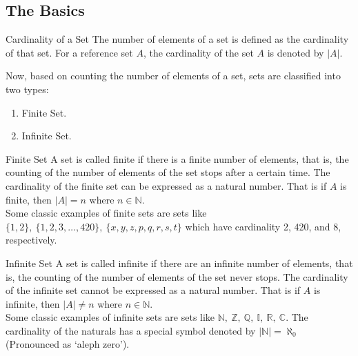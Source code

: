 \subsection{The Basics}
\begin{Definition}{Cardinality of a Set}\label{cardinality}
    The number of elements of a set is defined as the cardinality of that set. For a reference set $A$, the cardinality of the set $A$ is denoted by $|A|$.
\end{Definition}
\noindent Now, based on counting the number of elements of a set, sets are classified into two types:
\begin{enumerate}
    \item Finite Set.
    \item Infinite Set.
\end{enumerate}
\begin{Definition}{Finite Set}\label{finite_set}
    A set is called finite if there is a finite number of elements, that is, the counting of the number of elements of the set stops after a certain time. The cardinality of the finite set can be expressed as a natural number. That is if $A$ is finite, then $|A|=n$ where $n\in\mathbb{N}$.\\ Some classic examples of finite sets are sets like $\{1,2\},\ \{1,2,3,\dots,420\},\ \{x,y,z,p,q,r,s,t\}$ which have cardinality 2, 420, and 8, respectively.
\end{Definition}
\begin{Definition}{Infinite Set}\label{infinite_set}
    A set is called infinite if there are an infinite number of elements, that is, the counting of the number of elements of the set never stops. The cardinality of the infinite set cannot be expressed as a natural number. That is if $A$ is infinite, then $|A|\neq n$ where $n\in\mathbb{N}$.\\
    Some classic examples of infinite sets are sets like $\mathbb{N,\ Z,\ Q,\ I,\ R,\ C}$. The cardinality of the naturals has a special symbol denoted by $|\mathbb{N}|=\aleph_0$ (Pronounced as `aleph zero').
\end{Definition}
